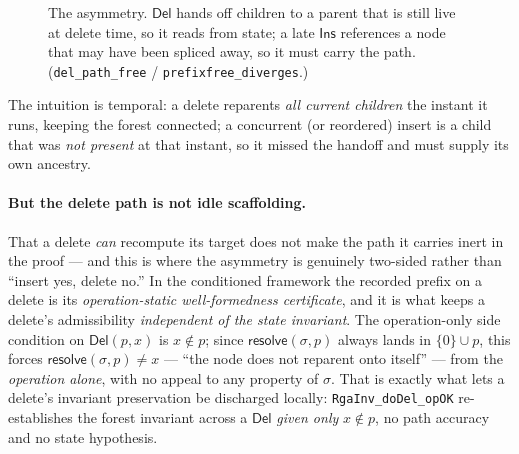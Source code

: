 \documentclass[11pt]{article}
\newcommand{\anc}{\mathsf{anc}}
\newcommand{\resolve}{\mathsf{resolve}}
\newcommand{\Ins}{\mathsf{Ins}}
\newcommand{\Del}{\mathsf{Del}}
\begin{document}
\begin{figure}[h]
\centering
{}
\caption{The asymmetry. $\Del$ hands off children to a parent that is still live at
delete time, so it reads from state; a late $\Ins$ references a node that may have
been spliced away, so it must carry the path. (\texttt{del\_path\_free} /
\texttt{prefixfree\_diverges}.)}
\label{fig:asym}
\end{figure}

The intuition is temporal: a delete reparents \emph{all current children} the
instant it runs, keeping the forest connected; a concurrent (or reordered) insert
is a child that was \emph{not present} at that instant, so it missed the handoff
and must supply its own ancestry.

\paragraph{But the delete path is not idle scaffolding.} That a delete \emph{can}
recompute its target does not make the path it carries inert in the proof --- and
this is where the asymmetry is genuinely two-sided rather than ``insert yes, delete
no.'' In the conditioned framework the recorded prefix on a delete is its
\emph{operation-static well-formedness certificate}, and it is what keeps a delete's
admissibility \emph{independent of the state invariant}. The operation-only side
condition on $\Del(p,x)$ is $x\notin p$; since $\resolve(\sigma,p)$ always lands in
$\{0\}\cup p$, this forces $\resolve(\sigma,p)\neq x$ --- ``the node does not reparent
onto itself'' --- from the \emph{operation alone}, with no appeal to any property of
$\sigma$. That is exactly what lets a delete's invariant preservation be discharged
locally: \texttt{RgaInv\_doDel\_opOK} re-establishes the forest invariant across a
$\Del$ \emph{given only} $x\notin p$, no path accuracy and no state hypothesis.
\end{document}
